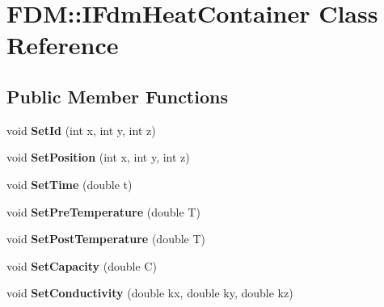 \hypertarget{class_f_d_m_1_1_i_fdm_heat_container}{}\section{F\+D\+M\+:\+:I\+Fdm\+Heat\+Container Class Reference}
\label{class_f_d_m_1_1_i_fdm_heat_container}
\subsection*{Public Member Functions}
\begin{DoxyCompactItemize}
\item 
\hypertarget{class_f_d_m_1_1_i_fdm_heat_container_a0d3d76b568c572ad3bb76b39beec9d1b}{}void {\bfseries Set\+Id} (int x, int y, int z)\label{class_f_d_m_1_1_i_fdm_heat_container_a0d3d76b568c572ad3bb76b39beec9d1b}

\item 
\hypertarget{class_f_d_m_1_1_i_fdm_heat_container_a89a0516c8ce6c997a82144ade100e89b}{}void {\bfseries Set\+Position} (int x, int y, int z)\label{class_f_d_m_1_1_i_fdm_heat_container_a89a0516c8ce6c997a82144ade100e89b}

\item 
\hypertarget{class_f_d_m_1_1_i_fdm_heat_container_a818cd88f1a2abd0831be642f88dc3ae3}{}void {\bfseries Set\+Time} (double t)\label{class_f_d_m_1_1_i_fdm_heat_container_a818cd88f1a2abd0831be642f88dc3ae3}

\item 
\hypertarget{class_f_d_m_1_1_i_fdm_heat_container_ad89e1ba28492fd01f5b553532f8040f0}{}void {\bfseries Set\+Pre\+Temperature} (double T)\label{class_f_d_m_1_1_i_fdm_heat_container_ad89e1ba28492fd01f5b553532f8040f0}

\item 
\hypertarget{class_f_d_m_1_1_i_fdm_heat_container_ab19434b5603bb2aaa7d496e145a8d5be}{}void {\bfseries Set\+Post\+Temperature} (double T)\label{class_f_d_m_1_1_i_fdm_heat_container_ab19434b5603bb2aaa7d496e145a8d5be}

\item 
\hypertarget{class_f_d_m_1_1_i_fdm_heat_container_a3a8361c097d40d5b6eaac6b441114c13}{}void {\bfseries Set\+Capacity} (double C)\label{class_f_d_m_1_1_i_fdm_heat_container_a3a8361c097d40d5b6eaac6b441114c13}

\item 
\hypertarget{class_f_d_m_1_1_i_fdm_heat_container_af08d23ced0f56d06e9b4c54059da1992}{}void {\bfseries Set\+Conductivity} (double kx, double ky, double kz)\label{class_f_d_m_1_1_i_fdm_heat_container_af08d23ced0f56d06e9b4c54059da1992}


\end{DoxyCompactItemize}
